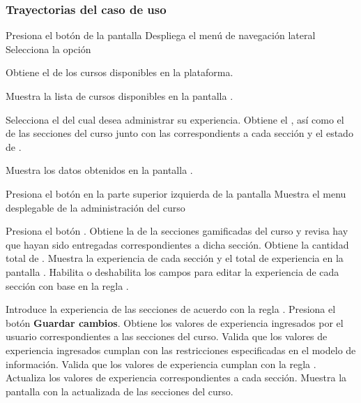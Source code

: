 \subsubsection{Trayectorias del caso de uso}

\begin{UCtrayectoria}%
%
  \Actor Presiona el botón \IUMenu de la pantalla 
  \Sistema Despliega el menú de navegación lateral
  \Actor Selecciona la opción 

  \Sistema Obtiene el  de los cursos disponibles en la
           plataforma.

  \Sistema Muestra la lista de cursos disponibles en la pantalla .

  \Actor Selecciona el  del cual desea administrar su experiencia.
  \Sistema Obtiene el , 
           así como el  de las secciones 
           del curso junto con las  
           correspondients a cada sección y el estado de .

  \Sistema Muestra los datos obtenidos en la pantalla .
           \label{CU-E07-pantalla}

  \Actor Presiona el botón \IUAdminSitio en la parte superior izquierda de la pantalla
  \Sistema Muestra el menu desplegable de la administración del curso

  \Actor Presiona el botón . 
  \Sistema Obtiene la  de la secciones gamificadas del 
           curso y revisa hay  que hayan sido
           entregadas correspondientes a dicha sección.
  \Sistema Obtiene la cantidad total de .
  \Sistema Muestra la experiencia de cada sección y el total de experiencia 
           en la pantalla .
  \Sistema Habilita o deshabilita los campos para editar la experiencia de cada 
           sección con base en la regla .

  \Actor Introduce la experiencia de las secciones de acuerdo con la regla
         . 
  \Actor Presiona el botón {\bf Guardar cambios}.  \label{CU-E07-submit}
  \Sistema Obtiene los valores de experiencia ingresados por el usuario
           correspondientes a las secciones del curso.
  \Sistema Valida que los valores de experiencia ingresados cumplan con las
           restricciones especificadas en el modelo de información. 
  \Sistema Valida que los valores de experiencia cumplan con la regla
            .
  \Sistema Actualiza los valores de experiencia correspondientes a cada sección.
           \label{CU-E07-finish}
  \Sistema Muestra la pantalla  con la 
           actualizada de las secciones del curso.
           

\end{UCtrayectoria}

